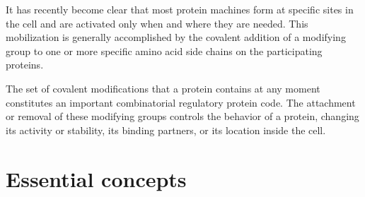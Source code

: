 It has recently become clear that
most protein machines form at specific sites in the cell and are activated
only when and where they are needed. This mobilization is generally
accomplished by the covalent addition of a modifying group to one or
more specific amino acid side chains on the participating proteins.

The set of covalent modifications that a protein contains at any moment
constitutes an important combinatorial regulatory protein code. The
attachment or removal of these modifying groups controls the behavior
of a protein, changing its activity or stability, its binding partners, or its
location inside the cell.

\section{Essential concepts}

